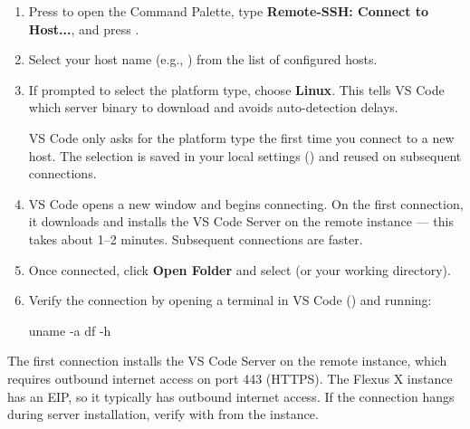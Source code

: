 \documentclass{guide}
\begin{document}
\stepbystep
\begin{enumerate}
  \item Press  to open the Command Palette, type
        \textbf{Remote-SSH: Connect to Host...}, and press .


  \item Select your host name (e.g., ) from the list
        of configured hosts.

  \item If prompted to select the platform type, choose \textbf{Linux}.
        This tells VS Code which server binary to download and avoids
        auto-detection delays.

  \begin{infobox}
  VS Code only asks for the platform type the first time you connect to a
  new host. The selection is saved in your local settings
  () and reused on subsequent connections.
  \end{infobox}

  \item VS Code opens a new window and begins connecting. On the first
        connection, it downloads and installs the VS Code Server on the
        remote instance --- this takes about 1--2 minutes. Subsequent
        connections are faster.

  \item Once connected, click \textbf{Open Folder} and select
         (or your working directory).

  \item Verify the connection by opening a terminal in VS Code
        () and running:

  \begin{code}[bash]
uname -a
df -h
  \end{code}
\end{enumerate}

\begin{infobox}
The first connection installs the VS Code Server on the remote instance, which
requires outbound internet access on port 443 (HTTPS). The Flexus X instance
has an EIP, so it typically has outbound internet access. If the connection
hangs during server installation, verify with
 from the instance.
\end{infobox}
\end{document}
